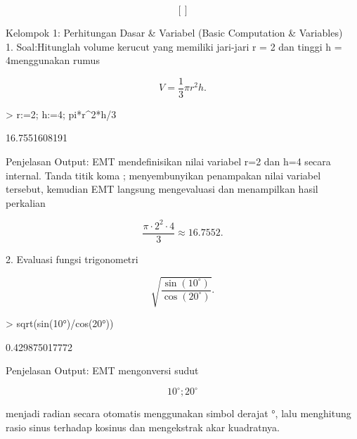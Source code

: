\documentclass[a4paper,10pt]{article}
\begin{document}
\begin{eulernotebook}
\begin{euleroutput}
\end{euleroutput}
\begin{eulerformula}
\[
\left[  \right] 
\]
\end{eulerformula}
\begin{eulercomment}
Kelompok 1: Perhitungan Dasar \& Variabel (Basic Computation \&
Variables)\\
1. Soal:Hitunglah volume kerucut yang memiliki jari-jari r = 2 dan
tinggi h = 4\textdollar{}menggunakan rumus\\
\end{eulercomment}
\begin{eulerformula}
\[
V = \frac{1}{3} \pi r^2 h.
\]
\end{eulerformula}
\begin{eulerprompt}
> r:=2; h:=4; pi*r^2*h/3
\end{eulerprompt}
\begin{euleroutput}
  16.7551608191
\end{euleroutput}
\begin{eulercomment}
Penjelasan Output: EMT mendefinisikan nilai variabel r=2 dan h=4
secara internal. Tanda titik koma ; menyembunyikan penampakan nilai
variabel tersebut, kemudian EMT langsung mengevaluasi dan menampilkan
hasil perkalian\\
\end{eulercomment}
\begin{eulerformula}
\[
\frac{\pi \cdot 2^2 \cdot 4}{3} \approx 16.7552.
\]
\end{eulerformula}
\begin{eulercomment}
2. Evaluasi fungsi trigonometri \\
\end{eulercomment}
\begin{eulerformula}
\[
\sqrt{\frac{\sin(10^\circ)}{\cos(20^\circ)}}.
\]
\end{eulerformula}
\begin{eulerprompt}
> sqrt(sin(10°)/cos(20°))
\end{eulerprompt}
\begin{euleroutput}
  0.429875017772
\end{euleroutput}
\begin{eulercomment}
Penjelasan Output: EMT mengonversi sudut\\
\end{eulercomment}
\begin{eulerformula}
\[
10^\circ ; 20^\circ
\]
\end{eulerformula}
\begin{eulercomment}
menjadi radian secara otomatis menggunakan simbol derajat °, lalu
menghitung rasio sinus terhadap kosinus dan mengekstrak akar
kuadratnya.


\end{eulercomment}
\end{eulernotebook}
\end{document}
